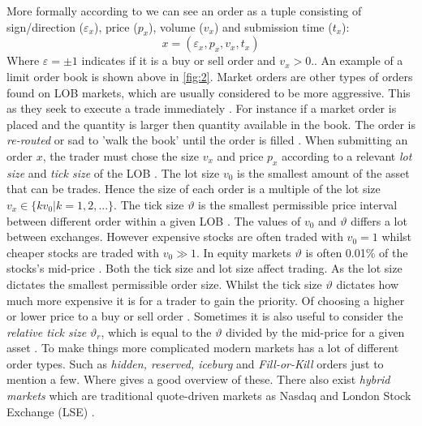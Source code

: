 \documentclass{kththesis}
\theoremstyle{definition}
\begin{document}
More formally according to \textcite{bouchaud2018trades} we can see an order as a tuple consisting of sign/direction ($\varepsilon_{x}$), price ($p_{x}$), volume ($v_{x}$) and submission time ($t_{x}$):
\begin{equation}
    \label{eq:0}
    x = (\varepsilon_{x}, p_{x}, v_{x}, t_{x})
\end{equation} Where $\varepsilon = \pm 1$ indicates if it is a buy or sell order and $v_{x} > 0$.. An example of a limit order book is shown above in \autoref{fig:2}. Market orders are other types of orders found on LOB markets, which are usually considered to be more aggressive. This as they seek to execute a trade immediately \parencite{cartea2015algorithmic}. For instance if a market order is placed and the quantity is larger then quantity available in the book. The order is \textit{re-routed} or sad to 'walk the book' until the order is filled \parencite{hasbrouck2007empirical,cartea2015algorithmic}.
\newline
\newline
When submitting an order $x$, the trader must chose the size $v_x$ and price $p_{x}$ according to a relevant \textit{lot size} and \textit{tick size} of the LOB \parencite{bouchaud2018trades}. The lot size $v_0$ is the smallest amount of the asset that can be trades. Hence the size of each order is a multiple of the lot size $v_{x} \in \{kv_{0} | k = 1,2,...\}$. The tick size $\vartheta$ is the smallest permissible price interval between different order within a given LOB \parencite{bouchaud2018trades}. The values of $v_{0}$ and $\vartheta$ differs a lot between exchanges. However expensive stocks are often traded with $v_0 = 1$ whilst cheaper stocks are traded with $v_{0} \gg 1$. In equity markets $\vartheta$ is often 0.01\% of the stocks's mid-price \parencite{bouchaud2018trades}. 
\newline
\newline
Both the tick size and lot size affect trading. As the lot size dictates the smallest permissible order size. Whilst the tick size $\vartheta$ dictates how much more expensive it is for a trader to gain the priority. Of choosing a higher or lower price to a buy or sell order \parencite{bouchaud2018trades}. Sometimes it is also useful to consider the \textit{relative tick size} $\vartheta_r$, which is equal to the $\vartheta$ divided by the mid-price for a given asset \parencite{bouchaud2018trades}. To make things more complicated modern markets has a lot of different order types. Such as \textit{hidden, reserved, iceburg} and \textit{Fill-or-Kill} orders just to mention a few. Where \parencite{foucault2013market, cartea2015algorithmic, hasbrouck2007empirical} gives a good overview of these. There also exist \textit{hybrid markets} which are traditional quote-driven markets as Nasdaq and London Stock Exchange (LSE) \parencite{foucault2013market}.
\end{document}
